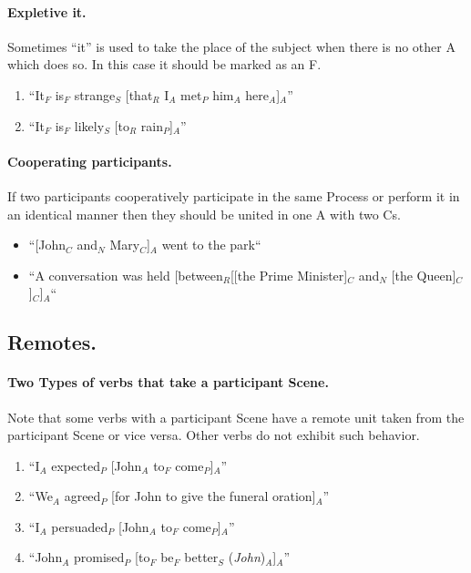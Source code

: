 \documentclass[11pt]{article}
\newcommand{\be}{\begin{enumerate}}
\newcommand{\ee}{\end{enumerate}}
\newcommand{\nss}[1]{{\color{magenta}{NSS: #1}}}
\newcommand{\rem}[1]{{(\it #1})}
\begin{document}
\paragraph{Expletive it.} Sometimes ``it'' is used to take the place of the subject when there is no other A which does so. In this case it should be marked as an F.
\be
\item
``It$_F$ is$_F$ strange$_S$ [that$_R$ I$_A$ met$_P$ him$_A$ here$_A$]$_A$''
\item
``It$_F$ is$_F$ likely$_S$ [to$_R$ rain$_P$]$_A$''
\ee

\paragraph {Cooperating participants.} If two participants cooperatively participate in the same Process or perform it in an identical manner then they should be united in one A with two Cs. \nss{This only applies if they are coordinated, right? ``John and Mary played tennis'', not ``John played tennis with Mary.''}
 
\begin {itemize} 
\item
``[John$_C$ and$_N$ Mary$_C$]$_A$ went to the park``
\item
``A conversation was held [between$_R$[[the Prime Minister]$_C$ and$_N$ [the Queen]$_C$]$_C$]$_A$``
\end {itemize}


\subsection{Remotes.}

\paragraph{Two Types of verbs that take a participant Scene.} Note that some verbs with a participant Scene have a remote unit taken from the participant Scene or vice versa. Other verbs do not exhibit such behavior.
\be
\item
``I$_A$ expected$_P$ [John$_A$ to$_F$ come$_P$]$_A$''
\item
``We$_A$ agreed$_P$ [for John to give the funeral oration]$_A$''
\item
``I$_A$ persuaded$_P$ [John$_A$ to$_F$ come$_P$]$_A$''
\item
``John$_A$ promised$_P$ [to$_F$ be$_F$ better$_S$ \rem{John}$_A$]$_A$''
\ee
\end{document}

